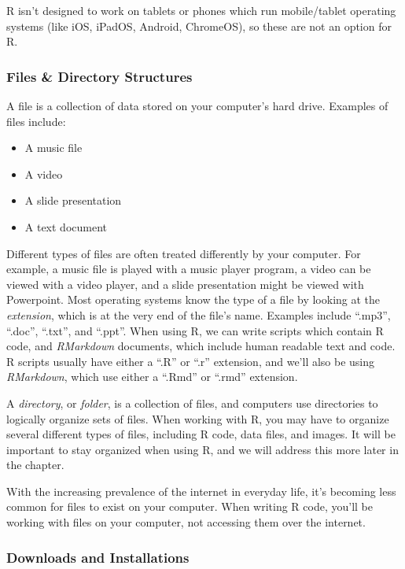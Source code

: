 \documentclass[
]{article}
\providecommand{\tightlist}{%
  \setlength{\itemsep}{0pt}\setlength{\parskip}{0pt}}
\begin{document}
R isn't designed to work on tablets or phones which run mobile/tablet operating systems (like iOS, iPadOS, Android, ChromeOS), so these are not an option for R.

\hypertarget{files-directory-structures}{%
\subsubsection{Files \& Directory Structures}\label{files-directory-structures}}

A file is a collection of data stored on your computer's hard drive.
Examples of files include:

\begin{itemize}
\tightlist
\item
  A music file
\item
  A video
\item
  A slide presentation
\item
  A text document
\end{itemize}

Different types of files are often treated differently by your computer.
For example, a music file is played with a music player program, a video can be viewed with a video player, and a slide presentation might be viewed with Powerpoint.
Most operating systems know the type of a file by looking at the \emph{extension}, which is at the very end of the file's name.
Examples include ``.mp3'', ``.doc'', ``.txt'', and ``.ppt''.
When using R, we can write scripts which contain R code, and \emph{RMarkdown} documents, which include human readable text and code.
R scripts usually have either a ``.R'' or ``.r'' extension, and we'll also be using \emph{RMarkdown}, which use either a ``.Rmd'' or ``.rmd'' extension.

A \emph{directory}, or \emph{folder}, is a collection of files, and computers use directories to logically organize sets of files.
When working with R, you may have to organize several different types of files, including R code, data files, and images.
It will be important to stay organized when using R, and we will address this more later in the chapter.

With the increasing prevalence of the internet in everyday life, it's becoming less common for files to exist on your computer.
When writing R code, you'll be working with files on your computer, not accessing them over the internet.

\hypertarget{downloads-and-installations}{%
\subsubsection{Downloads and Installations}\label{downloads-and-installations}}
\end{document}

